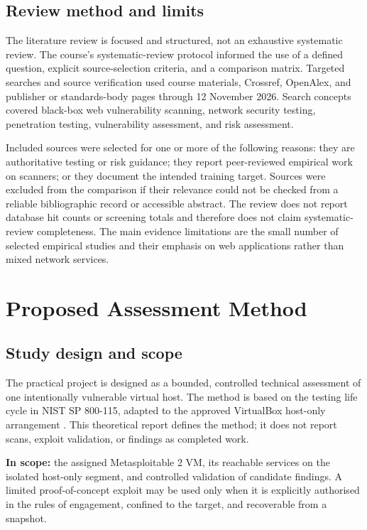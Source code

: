 \documentclass[11pt,a4paper]{article}
\begin{document}
\subsection{Review method and limits}
The literature review is focused and structured, not an exhaustive systematic review. The course's systematic-review protocol informed the use of a defined question, explicit source-selection criteria, and a comparison matrix. Targeted searches and source verification used course materials, Crossref, OpenAlex, and publisher or standards-body pages through 12 November 2026. Search concepts covered black-box web vulnerability scanning, network security testing, penetration testing, vulnerability assessment, and risk assessment.

Included sources were selected for one or more of the following reasons: they are authoritative testing or risk guidance; they report peer-reviewed empirical work on scanners; or they document the intended training target. Sources were excluded from the comparison if their relevance could not be checked from a reliable bibliographic record or accessible abstract. The review does not report database hit counts or screening totals and therefore does not claim systematic-review completeness. The main evidence limitations are the small number of selected empirical studies and their emphasis on web applications rather than mixed network services.

\section{Proposed Assessment Method}
\subsection{Study design and scope}
The practical project is designed as a bounded, controlled technical assessment of one intentionally vulnerable virtual host. The method is based on the testing life cycle in NIST SP 800-115, adapted to the approved VirtualBox host-only arrangement \citep{scarfone2008}. This theoretical report defines the method; it does not report scans, exploit validation, or findings as completed work.

\textbf{In scope:} the assigned Metasploitable 2 VM, its reachable services on the isolated host-only segment, and controlled validation of candidate findings. A limited proof-of-concept exploit may be used only when it is explicitly authorised in the rules of engagement, confined to the target, and recoverable from a snapshot.
\end{document}
